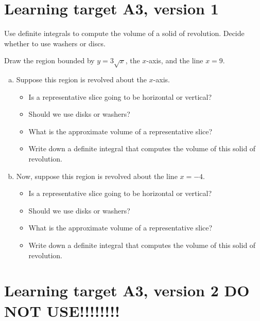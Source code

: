 




\everymath{\displaystyle}

\section{Learning target A3, version 1}

Use definite integrals to compute the volume of a solid of revolution. Decide whether to use washers or discs.

\hrulefill

Draw the region bounded by \(y=3\sqrt{x}\), the $x$-axis, and the line $x=9$.

\begin{enumerate}[(a), leftmargin=20pt]
	\item Suppose this region is revolved about the $x$-axis.
	\begin{itemize}
		\item Is a representative slice going to be horizontal or vertical?
		\item Should we use disks or washers?
		\item What is the approximate volume of a representative slice?
		\item Write down a definite integral that computes the volume of this solid of revolution.
	\end{itemize}

	\vfill

	\item Now, suppose this region is revolved about the line $x=-4$.
	\begin{itemize}
		\item Is a representative slice going to be horizontal or vertical?
		\item Should we use disks or washers?
		\item What is the approximate volume of a representative slice?
		\item Write down a definite integral that computes the volume of this solid of revolution.
	\end{itemize}

	\vfill
\end{enumerate}

\pagebreak
\section{Learning target A3, version 2 DO NOT USE!!!!!!!!}

